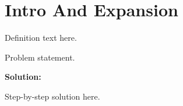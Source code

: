 \section{Intro And Expansion}


\begin{definition}[Term]
Definition text here.
\end{definition}

\begin{example}
Problem statement.

\textbf{Solution:}

Step-by-step solution here.
\end{example}
